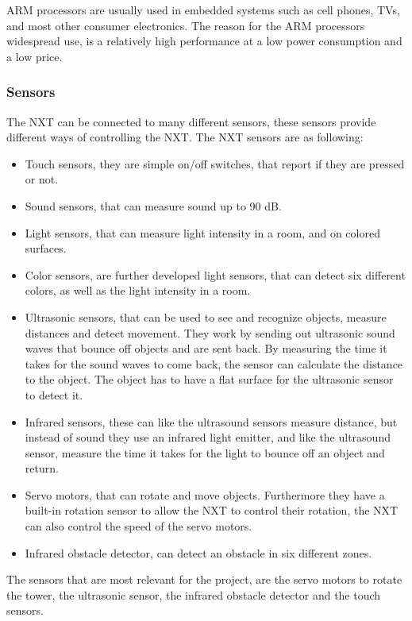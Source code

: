 ARM processors are usually used in embedded systems such as cell phones, TVs, and most other consumer electronics. The reason for the ARM processors widespread use, is a relatively high performance at a low power consumption and a low price.

\subsubsection{Sensors}
The NXT can be connected to many different sensors, these sensors provide different ways of controlling the NXT.
The NXT sensors are as following\cite{nxtspec}:

\begin{itemize}
\item Touch sensors, they are simple on/off switches, that report if they are pressed or not.
\item Sound sensors, that can measure sound up to 90 dB.
\item Light sensors, that can measure light intensity in a room, and on colored surfaces.
\item Color sensors, are further developed light sensors, that can detect six different colors, as well as the light intensity in a room.
\item Ultrasonic sensors, that can be used to see and recognize objects, measure distances and detect movement. They work by sending out ultrasonic sound waves that bounce off objects and are sent back. By measuring the time it takes for the sound waves to come back, the sensor can calculate the distance to the object. The object has to have a flat surface for the ultrasonic sensor to detect it.
\item Infrared sensors, these can like the ultrasound sensors measure distance, but instead of sound they use an infrared light emitter, and like the ultrasound sensor, measure the time it takes for the light to bounce off an object and return.
\item Servo motors, that can rotate and move objects. Furthermore they have a built-in rotation sensor to allow the NXT to control their rotation, the NXT can also control the speed of the servo motors.
\item Infrared obstacle detector, can detect an obstacle in six different zones.
\end{itemize}

The sensors that are most relevant for the project, are the servo motors to rotate the tower, the ultrasonic sensor, the infrared obstacle detector and the touch sensors.

